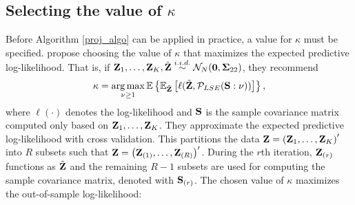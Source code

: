 \documentclass[11pt]{article}
\newcommand{\E}{\mathbb{E}}
\DeclareMathOperator*{\argmax}{arg\,max}
\theoremstyle{definition}
\theoremstyle{definition}
\def\bSigma{{\bf \Sigma}}
\def\Z{{\bf Z}}
\def\SS{{\bf S}}
\def\E{{\mathbb E}}
\begin{document}
\subsection{Selecting the value of $\kappa$}
\label{condSelection}
Before Algorithm \ref{proj_algo} can be applied in practice, a value for $\kappa$ must be specified.
 \cite{won2006maximum} propose choosing the value of $\kappa$ that maximizes the expected predictive log-likelihood. That is, if $\Z_1, \dots, \Z_K,  \tilde{\Z}\stackrel{i.i.d.}{\sim} \mathcal{N}_{N}(\boldsymbol{0}, \bSigma_{22})$, they recommend $$\kappa = \argmax_{\nu \geq 1} \E \left\{ \E_{\tilde{\Z}} \left[  \ell(\tilde{\Z},  \mathcal{P}_{LSE}(\SS : \nu)) \right] \right\},$$ where $\ell(\cdot)$ denotes the log-likelihood  and $\SS$ is the sample covariance matrix computed only based on $\Z_1, \dots, \Z_K$. They approximate the expected predictive log-likelihood with cross validation. This partitions the data $\Z = \left(\Z_{1}, \dots, \Z_{K}\right)'$ into $R$ subsets such that  $\Z = \left(\Z_{(1)}, \dots, \Z_{(R)}\right)'$. During the $r$th iteration, $\Z_{(r)}$ functions as $\tilde{\Z}$ and the remaining $R-1$ subsets are used for computing the sample covariance matrix, denoted  with $\SS_{(r)}$. 
The chosen value of $\kappa$ maximizes the out-of-sample log-likelihood:
\end{document}
